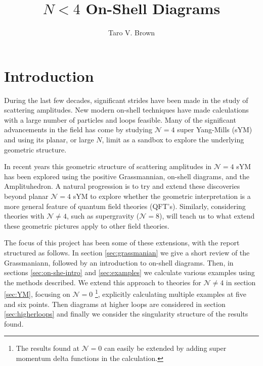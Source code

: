 \documentclass[letter,11pt]{article}
\title{$N<4$ On-Shell Diagrams}
\author[a]{Taro V. Brown}
\affiliation[a]{Department of Physics, UC Davis, One Shields Avenue, Davis, CA 95616, USA }
\begin{document}
 
\maketitle
\flushbottom
\newpage
\section{Introduction}
During the last few decades, significant strides have been made in the study of scattering amplitudes. New modern on-shell techniques have made calculations with a large number of particles and loops feasible. Many of the significant advancements in the field has come by studying $\mathcal N = 4$ super Yang-Mills (sYM)
and using its planar, or large $N$, limit as a sandbox to explore the underlying geometric structure. 

In recent years this geometric structure of scattering amplitudes in $\mathcal N = 4$
sYM has been explored using the positive Grassmannian, on-shell diagrams, and
the Amplituhedron. A natural progression is to try and extend these discoveries beyond planar $\mathcal N = 4$ sYM to explore whether the geometric interpretation is a more general feature of quantum field theories (QFT’s). Similarly, considering theories with $\mathcal N\neq 4$, such as supergravity ($\mathcal N = 8$), will teach us to what extend these geometric pictures apply to other field theories. 

The focus of this project has been some of these extensions, with the report structured as follows. In section \ref{sec:grassmanian} we give a short review of the Grassmaniann, followed by an introduction to on-shell diagrams. Then, in sections \ref{sec:on-she-intro} and \ref{sec:examples} we calculate various examples using the methods described. We extend this approach to theories for $\mathcal{N}\neq 4$ in section \ref{sec:YM}, focusing on $\mathcal N=0$ \footnote{The results found at $\mathcal{N}=0$ can easily be extended by adding super momentum delta functions in the calculation.}, explicitly calculating multiple examples at five and six points. Then diagrams at higher loops are considered in section \ref{sec:higherloops} and finally we consider the singularity structure of the results found.
\end{document}
